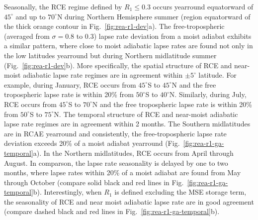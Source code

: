 \documentclass{ametsocV5}
\begin{document}
    Seasonally, the RCE regime defined by $R_1 \le 0.3$ occurs yearround equatorward of $45^\circ$ and up to $70^\circ$N during Northern Hemisphere summer (region equatorward of the thick orange contour in Fig.~\ref{fig:rea-r1-dev}a). The free-tropospheric (averaged from $\sigma=0.8$ to 0.3) lapse rate deviation from a moist adiabat exhibits a similar pattern, where close to moist adiabatic lapse rates are found not only in the low latitudes yearround but during Northern midlatitude summer (Fig.~\ref{fig:rea-r1-dev}b). More specifically, the spatial structure of RCE and near-moist adiabatic lapse rate regimes are in agreement within $\pm5^\circ$ latitude. For example, during January, RCE occurs from $45^\circ$S to $45^\circ$N and the free tropospheric lapse rate is within 20\% from $50^\circ$S to $40^\circ$N. Similarly, during July, RCE occurs from $45^\circ$S to $70^\circ$N and the free tropospheric lapse rate is within 20\% from $50^\circ$S to $75^\circ$N. The temporal structure of RCE and near-moist adiabatic lapse rate regimes are in agreement within 2 months. The Southern midlatitudes are in RCAE yearround and consistently, the free-tropospheric lapse rate deviation exceeds 20\% of a moist adiabat yearround (Fig.~\ref{fig:rea-r1-ga-temporal}a). In the Northern midlatitudes, RCE occurs from April through August. In comparson, the lapse rate seasonality is delayed by one to two months, where lapse rates within 20\% of a moist adiabat are found from May through October (compare solid black and red lines in Fig.~\ref{fig:rea-r1-ga-temporal}b). Interestingly, when $R_1$ is defined excluding the MSE storage term, the seasonality of RCE and near moist adiabatic lapse rate are in good agreement (compare dashed black and red lines in Fig.~\ref{fig:rea-r1-ga-temporal}b).
    
\end{document}
